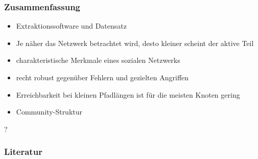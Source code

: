 \documentclass[10pt]{beamer}
\begin{document}
\begin{frame}
  \frametitle{Zusammenfassung}
  \begin{itemize}
  \item Extraktionssoftware und Datensatz
  \item Je n\"aher das Netzwerk betrachtet wird, desto kleiner scheint
    der aktive Teil
  \item charakteristische Merkmale eines sozialen Netzwerks
  \item recht robust gegen\"uber Fehlern und gezielten Angriffen
  \item Erreichbarkeit bei kleinen Pfadl\"angen ist f\"ur die meisten
    Knoten gering
  \item Community-Struktur
  \end{itemize}
\end{frame}


\begin{frame}
  \begin{center}
    {\Huge ?}
  \end{center}
  
\end{frame}

\begin{frame}
\nocite{PhysRevE.68.036122}
\nocite{Clauset2009}
\nocite{Albert2000}
\nocite{Fortunato2010}
  \frametitle{Literatur}
  
  {\small
  
  
}
\end{frame}
\end{document}

